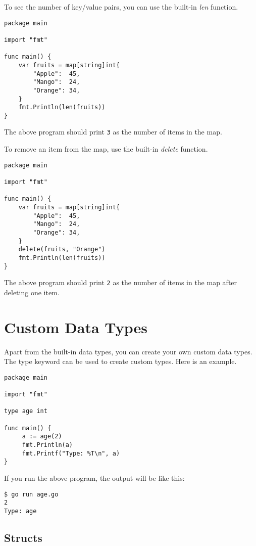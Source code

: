 To see the number of key/value pairs, you can use the built-in \textit{len}
function.

\begin{lstlisting}[numbers=none]
package main

import "fmt"

func main() {
	var fruits = map[string]int{
		"Apple":  45,
		"Mango":  24,
		"Orange": 34,
	}
	fmt.Println(len(fruits))
}
\end{lstlisting}

The above program should print \texttt{3} as the number of items in the map.

To remove an item from the map, use the built-in \textit{delete} function.

\begin{lstlisting}[numbers=none]
package main

import "fmt"

func main() {
	var fruits = map[string]int{
		"Apple":  45,
		"Mango":  24,
		"Orange": 34,
	}
	delete(fruits, "Orange")
	fmt.Println(len(fruits))
}
\end{lstlisting}

The above program should print \texttt{2} as the number of items in the map
after deleting one item.

\section{Custom Data Types}

Apart from the built-in data types, you can create your own custom
data types.  The type keyword
can be used to create custom types.  Here is an example.

\begin{lstlisting}[numbers=none]
package main

import "fmt"

type age int

func main() {
     a := age(2)
     fmt.Println(a)
     fmt.Printf("Type: %T\n", a)
}
\end{lstlisting}

If you run the above program, the output will be like this:

\begin{lstlisting}[numbers=none]
$ go run age.go
2
Type: age
\end{lstlisting}

\subsection{Structs}

